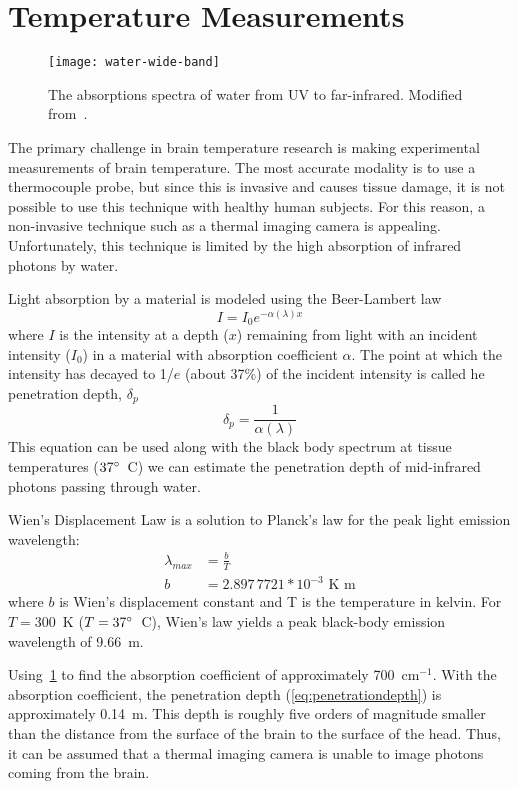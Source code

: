 \section{Temperature Measurements}
\begin{figure}[tb]
  \centering
  \texttt{[image: water-wide-band]}
  \caption[Wide-band absorption spectra of water]{\label{fig:waterabs}The absorptions spectra of water from UV to far-infrared.  Modified from~\citet{hale73}.}
\end{figure}

The primary challenge in brain temperature research is making experimental measurements of brain temperature.  The most accurate modality is to use a thermocouple probe, but since this is invasive and causes tissue damage, it is not possible to use this technique with healthy human subjects.  For this reason, a non-invasive technique such as a thermal imaging camera is appealing.  Unfortunately, this technique is limited by the high absorption of infrared photons by water.

Light absorption by a material is modeled using the Beer-Lambert law
\begin{equation}
  I = I_0 e^{-\alpha (\lambda) x} \label{eq:beerlambert}
\end{equation}
where $I$ is the intensity at a depth ($x$) remaining from light with an incident intensity ($I_0$) in a material with absorption coefficient $\alpha$.  The point at which the intensity has decayed to 1/$e$ (about 37\%) of the incident intensity is called he penetration depth, $\delta_{p}$
\begin{equation}
  \delta_p = \frac{1}{\alpha (\lambda)} \label{eq:penetrationdepth}
\end{equation}
This equation can be used along with the black body spectrum at tissue temperatures ($37^\circ$~C) we can estimate the penetration depth of mid-infrared photons passing through water.

Wien's Displacement Law is a solution to Planck's law for the peak light emission wavelength:
\begin{align}
  \lambda_{max} &= \frac{b}{T} \label{eq:wienslaw} \\
  b &= 2.897\,7721 * 10^{-3} \mbox{ K m} \nonumber
\end{align}
where $b$ is Wien's displacement constant and T is the temperature in kelvin.  For $T=300$~K ($T=37^\circ$~C), Wien's law yields a peak black-body emission wavelength of 9.66~\textmu m.  

Using~\cref{fig:waterabs} to find the absorption coefficient of approximately 700~cm$^{-1}$.  With the absorption coefficient, the penetration depth (\cref{eq:penetrationdepth}) is approximately 0.14~\textmu m.  This depth is roughly five orders of magnitude smaller than the distance from the surface of the brain to the surface of the head.  Thus, it can be assumed that a thermal imaging camera is unable to image photons coming from the brain.

